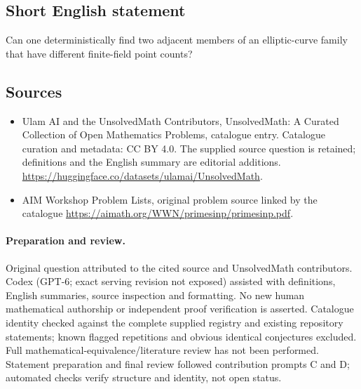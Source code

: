 \documentclass[11pt]{article}
\begin{document}
\subsection{Short English statement}
Can one deterministically find two adjacent members of an elliptic-curve family that have different finite-field point counts?
\subsection{Sources}
\begin{itemize}
\item[\hypertarget{source:statement:1}{S1}] Ulam AI and the UnsolvedMath Contributors, UnsolvedMath: A Curated Collection of Open Mathematics Problems, catalogue entry. Catalogue curation and metadata: CC BY 4.0. The supplied source question is retained; definitions and the English summary are editorial additions.
\url{https://huggingface.co/datasets/ulamai/UnsolvedMath}.
\item[\hypertarget{source:statement:2}{S2}] AIM Workshop Problem Lists, original problem source linked by the catalogue
\url{https://aimath.org/WWN/primesinp/primesinp.pdf}.
\end{itemize}
\paragraph{Preparation and review.}
Original question attributed to the cited source and UnsolvedMath contributors. Codex (GPT-6; exact serving revision not exposed) assisted with definitions, English summaries, source inspection and formatting. No new human mathematical authorship or independent proof verification is asserted. Catalogue identity checked against the complete supplied registry and existing repository statements; known flagged repetitions and obvious identical conjectures excluded. Full mathematical-equivalence/literature review has not been performed. Statement preparation and final review followed contribution prompts C and D; automated checks verify structure and identity, not open status.
\label{end:statement}
\end{document}
